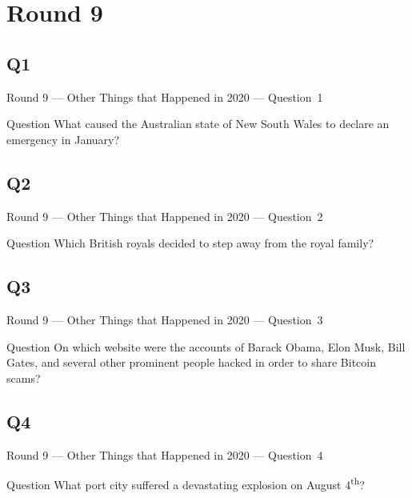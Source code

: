 \documentclass[11pt]{beamer}
\begin{document}
\section{Round 9}
\subsection*{Q1}
\begin{frame}[t]{Round 9 --- Other Things that Happened in 2020 --- \mbox{Question 1}}
    \vspace{-0.5em}
    \begin{block}{Question}
        What caused the Australian state of New South Wales to declare an emergency in January?
    \end{block}
\end{frame}
\subsection*{Q2}
\begin{frame}[t]{Round 9 --- Other Things that Happened in 2020 --- \mbox{Question 2}}
    \vspace{-0.5em}
    \begin{block}{Question}
        Which British royals decided to step away from the royal family?
    \end{block}
\end{frame}
\subsection*{Q3}
\begin{frame}[t]{Round 9 --- Other Things that Happened in 2020 --- \mbox{Question 3}}
    \vspace{-0.5em}
    \begin{block}{Question}
        On which website were the accounts of Barack Obama, Elon Musk, Bill Gates, and several other prominent people hacked in order to share Bitcoin scams?
    \end{block}
\end{frame}
\subsection*{Q4}
\begin{frame}[t]{Round 9 --- Other Things that Happened in 2020 --- \mbox{Question 4}}
    \vspace{-0.5em}
    \begin{block}{Question}
        What port city suffered a devastating explosion on August 4\textsuperscript{th}?
    \end{block}
\end{frame}
\end{document}

